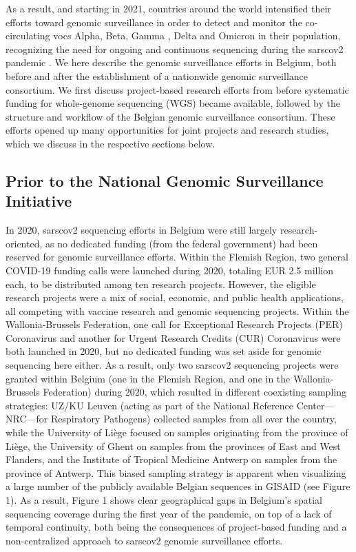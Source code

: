 As a result, and starting in 2021, countries around the world intensified their efforts toward genomic surveillance in order to detect and monitor the co-circulating \gls{voc}s Alpha, Beta, Gamma \citep{greaney2021comprehensive}, Delta and Omicron in their population, recognizing the need for ongoing and continuous sequencing during the \gls{sarscov2} pandemic \citep{martin2021insights}.
We here describe the genomic surveillance efforts in Belgium, both before and after the establishment of a nationwide genomic surveillance consortium.
We first discuss project-based research efforts from before systematic funding for whole-genome sequencing (WGS) became available, followed by the structure and workflow of the Belgian genomic surveillance consortium.
These efforts opened up many opportunities for joint projects and research studies, which we discuss in the respective sections below.


\subsection{Prior to the National Genomic Surveillance Initiative}
In 2020, \gls{sarscov2} sequencing efforts in Belgium were still largely research-oriented, as no dedicated funding (from the federal government) had been reserved for genomic surveillance efforts.
Within the Flemish Region, two general COVID-19 funding calls were launched during 2020, totaling EUR 2.5 million each, to be distributed among ten research projects.
However, the eligible research projects were a mix of social, economic, and public health applications, all competing with vaccine research and genomic sequencing projects.
Within the Wallonia-Brussels Federation, one call for Exceptional Research Projects (PER) Coronavirus and another for Urgent Research Credits (CUR) Coronavirus were both launched in 2020, but no dedicated funding was set aside for genomic sequencing here either.
As a result, only two \gls{sarscov2} sequencing projects were granted within Belgium (one in the Flemish Region, and one in the Wallonia-Brussels Federation) during 2020, which resulted in different coexisting sampling strategies: UZ/KU Leuven (acting as part of the National Reference Center—NRC—for Respiratory Pathogens) collected samples from all over the country, while the University of Li\`{e}ge focused on samples originating from the province of Li\`{e}ge, the University of Ghent on samples from the provinces of East and West Flanders, and the Institute of Tropical Medicine Antwerp on samples from the province of Antwerp.
This biased sampling strategy is apparent when visualizing a large number of the publicly available Belgian sequences in GISAID (see Figure 1).
As a result, Figure 1 shows clear geographical gaps in Belgium's spatial sequencing coverage during the first year of the pandemic, on top of a lack of temporal continuity, both being the consequences of project-based funding and a non-centralized approach to \gls{sarscov2} genomic surveillance efforts.

